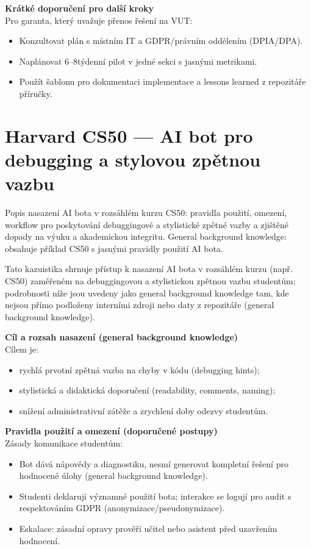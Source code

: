 \documentclass{report}%
\begin{document}
\bigskip
\textbf{Krátké doporučení pro další kroky}\\
Pro garanta, který uvažuje přenos řešení na VUT:
\begin{itemize}
  \item Konzultovat plán s místním IT a GDPR/právním oddělením (DPIA/DPA).
  \item Naplánovat 6–8týdenní pilot v jedné sekci s jasnými metrikami.
  \item Použít šablonu pro dokumentaci implementace a lessons learned z repozitáře příručky.
\end{itemize}%

%
\section{Harvard CS50 — AI bot pro debugging a stylovou zpětnou vazbu}%
Popis nasazení AI bota v rozsáhlém kurzu CS50: pravidla použití, omezení, workflow pro poskytování debuggingové a stylistické zpětné vazby a zjištěné dopady na výuku a akademickou integritu. General background knowledge: obsahuje příklad CS50 s jasnými pravidly použití AI bota.%


%
Tato kazuistika shrnuje přístup k nasazení AI bota v rozsáhlém kurzu (např. CS50) zaměřeném na debuggingovou a stylistickou zpětnou vazbu studentům; podrobnosti níže jsou uvedeny jako general background knowledge tam, kde nejsou přímo podloženy interními zdroji nebo daty z repozitáře (general background knowledge).

\medskip
\textbf{Cíl a rozsah nasazení (general background knowledge)}\\
Cílem je:
\begin{itemize}
  \item rychlá prvotní zpětná vazba na chyby v kódu (debugging hints);
  \item stylistická a didaktická doporučení (readability, comments, naming);
  \item snížení administrativní zátěže a zrychlení doby odezvy studentům.
\end{itemize}

\medskip
\textbf{Pravidla použití a omezení (doporučené postupy)}\\
Zásady komunikace studentům:
\begin{itemize}
  \item Bot dává nápovědy a diagnostiku, nesmí generovat kompletní řešení pro hodnocené úlohy (general background knowledge).
  \item Studenti deklarují významné použití bota; interakce se logují pro audit s respektováním GDPR (anonymizace/pseudonymizace).
  \item Eskalace: zásadní opravy prověří učitel nebo asistent před uzavřením hodnocení.
\end{itemize}
\end{document}
